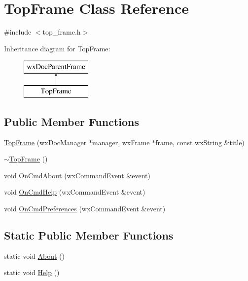 \hypertarget{a00146}{\section{Top\-Frame Class Reference}
\label{a00146}
}


{\ttfamily \#include $<$top\-\_\-frame.\-h$>$}

Inheritance diagram for Top\-Frame\-:\begin{figure}[H]
\begin{center}
\leavevmode
\includegraphics[height=2.000000cm]{a00146}
\end{center}
\end{figure}
\subsection*{Public Member Functions}
\begin{DoxyCompactItemize}
\item 
\hyperlink{a00146_a836efcbe525c9f8dff58ac0df4d5bf75}{Top\-Frame} (wx\-Doc\-Manager $\ast$manager, wx\-Frame $\ast$frame, const wx\-String \&title)
\item 
\hyperlink{a00146_ac367aaa31fe85041940f21a63ed1b33f}{$\sim$\-Top\-Frame} ()
\item 
void \hyperlink{a00146_a7e46e8486fd559aa8acbdbfeab0b4d07}{On\-Cmd\-About} (wx\-Command\-Event \&event)
\item 
void \hyperlink{a00146_a4f4072981f76f714a88a84fbda170f87}{On\-Cmd\-Help} (wx\-Command\-Event \&event)
\item 
void \hyperlink{a00146_a75837d5ff298502d1737b873e32df673}{On\-Cmd\-Preferences} (wx\-Command\-Event \&event)
\end{DoxyCompactItemize}
\subsection*{Static Public Member Functions}
\begin{DoxyCompactItemize}
\item 
static void \hyperlink{a00146_a02e22ffb0062b6a1be0edd1146124900}{About} ()
\item 
static void \hyperlink{a00146_a02e1a2a3b707402bf68144119876e1cc}{Help} ()
\end{DoxyCompactItemize}


